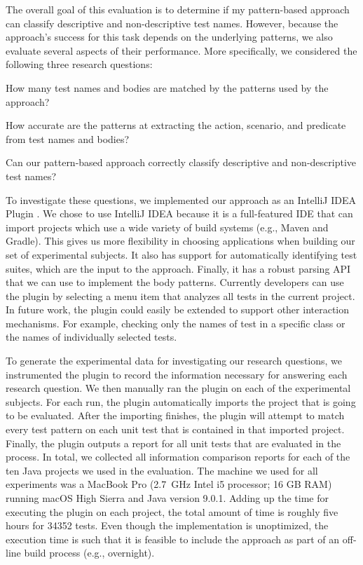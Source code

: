 The overall goal of this evaluation is to determine if my pattern-based approach can classify descriptive and non-descriptive test names. 
%
However, because the approach's success for this task depends on the underlying patterns, we also evaluate several aspects of their performance.
%
More specifically, we considered the following three research questions:
\begin{description}[font=\normalfont\emph]
\item[RQ1---Feasibility.] How many test names and bodies are matched by the patterns used by the approach?
\item[RQ2---Accuracy.] How accurate are the patterns at extracting the action, scenario, and predicate from test names and bodies?
\item[RQ3---Effectiveness.] Can our pattern-based approach correctly classify descriptive and non-descriptive test names?
\end{description}


To investigate these questions, we implemented our approach as an IntelliJ IDEA Plugin \cite{IntelliJPlugin}.
%
We chose to use IntelliJ IDEA because it is a full-featured IDE that can import projects which use a wide variety of build systems (e.g., Maven and Gradle).
%
This gives us more flexibility in choosing applications when building our set of experimental subjects.
%
It also has support for automatically identifying test suites, which are the input to the approach.
%
Finally, it has a robust parsing API that we can use to implement the body patterns.
Currently developers can use the plugin by selecting a menu item that analyzes all tests in the current project.
%
In future work, the plugin could easily be extended to support other interaction mechanisms.
%
For example, checking only the names of test in a specific class or the names of individually selected tests.


To generate the experimental data for investigating our research questions, we instrumented the plugin to record the information necessary for answering each research question.
%
We then manually ran the plugin on each of the experimental subjects.
%
For each run, the plugin automatically imports the project that is going to be evaluated.
%
After the importing finishes, the plugin will attempt to match every test pattern on each unit test that is contained in that imported project.
%
Finally, the plugin outputs a report for all unit tests that are evaluated in the process.
%
In total, we collected all information comparison reports for each of the ten Java projects we used in the evaluation.
%
The machine we used for all experiments was a MacBook Pro (\SI{2.7}{\giga\hertz} Intel i5 processor; 16 GB RAM) running macOS High Sierra and Java version 9.0.1.
%
Adding up the time for executing the plugin on each project, the total amount of time is roughly five hours for \num{34352} tests.
%
Even though the implementation is unoptimized, the execution time is such that it is feasible to include the approach as part of an off-line build process (e.g., overnight).


